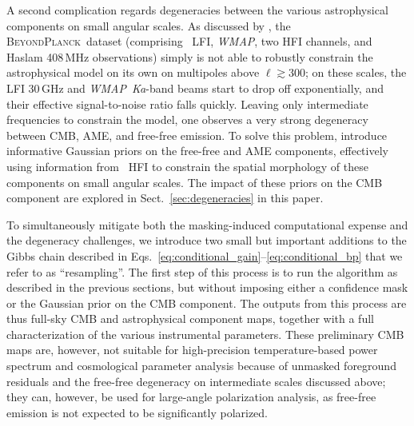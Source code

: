 \documentclass[twocolumn]{aa}
\def\WMAP{\textit{WMAP}}
\newcommand{\BP}{\textsc{BeyondPlanck}}
\begin{document}
A second complication regards degeneracies between the various
astrophysical components on small angular scales. As discussed by
\citet{bp13}, the \BP\ dataset (comprising \Planck\ LFI, \WMAP, two
HFI channels, and Haslam 408\,MHz observations) simply is not able to
robustly constrain the astrophysical model on its own on multipoles
above $\ell\gtrsim 300$; on these scales, the LFI 30\,GHz and
\WMAP\ \textit{Ka}-band beams start to drop off exponentially, and their
effective signal-to-noise ratio falls quickly. Leaving only
intermediate frequencies to constrain the model, one observes a very
strong degeneracy between CMB, AME, and free-free emission. To solve
this problem, \citet{bp13} introduce informative Gaussian priors on
the free-free and AME components, effectively using information from
\Planck\ HFI to constrain the spatial morphology of these components
on small angular scales. The impact of these priors on the CMB
component are explored in Sect.~\ref{sec:degeneracies} in this paper.

To simultaneously mitigate both the masking-induced computational
expense and the degeneracy challenges, we introduce two small
but important additions to the Gibbs chain described in
Eqs.~\eqref{eq:conditional_gain}--\eqref{eq:conditional_bp} that we
refer to as ``resampling''. The first step of this process is to run
the algorithm as described in the previous sections, but without
imposing either a confidence mask or the Gaussian prior on the CMB
component. The outputs from this process are thus full-sky CMB and
astrophysical component maps, together with a full characterization of
the various instrumental parameters. These preliminary CMB maps are,
however, not suitable for high-precision temperature-based power
spectrum and cosmological parameter analysis because of unmasked
foreground residuals and the free-free degeneracy on intermediate
scales discussed above; they can, however, be used for large-angle polarization
analysis, as free-free emission is not expected to be significantly polarized.
\end{document}
